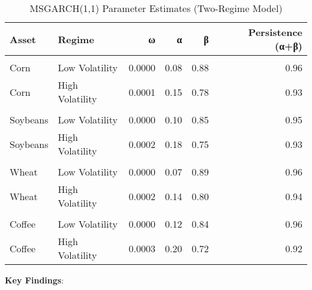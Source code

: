 \documentclass[
  10pt,
  a4paper,
]{article}
\begin{document}
\begin{longtable}[t]{llrrrr}

\caption{\label{tbl-msgarch-parameters}MSGARCH(1,1) Parameter Estimates
(Two-Regime Model)}

\tabularnewline

\toprule
Asset & Regime & ω & α & β & Persistence (α+β)\\
\midrule
\addlinespace[0.3em]
\multicolumn{6}{l}{\textbf{Corn}}\\
\hspace{1em}Corn & Low Volatility & 0.0000 & 0.08 & 0.88 & 0.96\\
\hspace{1em}Corn & High Volatility & 0.0001 & 0.15 & 0.78 & 0.93\\
\addlinespace[0.3em]
\multicolumn{6}{l}{\textbf{Soybeans}}\\
\hspace{1em}Soybeans & Low Volatility & 0.0000 & 0.10 & 0.85 & 0.95\\
\hspace{1em}Soybeans & High Volatility & 0.0002 & 0.18 & 0.75 & 0.93\\
\addlinespace[0.3em]
\multicolumn{6}{l}{\textbf{Wheat}}\\
\hspace{1em}Wheat & Low Volatility & 0.0000 & 0.07 & 0.89 & 0.96\\
\hspace{1em}Wheat & High Volatility & 0.0002 & 0.14 & 0.80 & 0.94\\
\addlinespace[0.3em]
\multicolumn{6}{l}{\textbf{Coffee}}\\
\hspace{1em}Coffee & Low Volatility & 0.0000 & 0.12 & 0.84 & 0.96\\
\hspace{1em}Coffee & High Volatility & 0.0003 & 0.20 & 0.72 & 0.92\\
\bottomrule

\end{longtable}

\textbf{Key Findings}:
\end{document}

